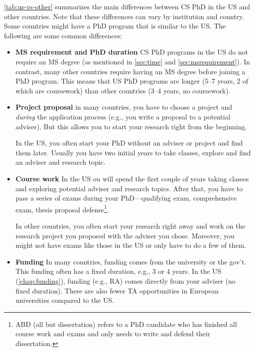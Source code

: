 \documentclass[oneside,11pt]{book}
\begin{document}
\autoref{tab:us-vs-other} summarizes the main differences between CS PhD in the US and other countries. Note that these differences can vary by institution and country.  Some countries might have a PhD program that is similar to the US.  The following are some common differences:
\begin{itemize}

\item \textbf{MS requirement and PhD duration}  CS PhD programs in the US do not require an MS degree (as mentioned in \autoref{sec:time} and \autoref{sec:msrequirement}).  In contrast, many other countries require having an MS degree before joining a PhD program.  This means that US PhD programs are longer (5--7 years, 2 of which are coursework) than other countries (3--4 years, no coursework).

\item \textbf{Project proposal} in many countries, you have to choose a project and  \emph{during} the application process (e.g., you write a proposal to a potential adviser). But this allows you to start your research right from the beginning. 

In the US, you often start your PhD without an adviser or project and find them later. Usually you have two initial years to take classes, explore and find an adviser and research topic. 

\item \textbf{Course work} In the US ou will spend the first couple of years taking classes and exploring potential adviser and research topics. 
After that, you have to pass a series of exams during your PhD---qualifying exam, comprehensive exam, thesis proposal defense\footnote{ABD (all but dissertation) refers to a PhD candidate who has finished all course work and exams and only needs to write and defend their dissertation.}.

In other countries, you often start your research right away and work on the research project you proposed with the adviser you chose. Moreover, you might not have exams like those in the US or only have to do a few of them.

\item \textbf{Funding}  In many countries, funding comes from the university or the gov't. This funding often has a fixed duration, e.g., 3 or 4 years.  In the US (\autoref{chap:funding}), funding (e.g., RA) comes directly from your adviser (no fixed duration).  There are also fewer TA opportunities in European universities compared to the US.


\end{itemize}
\end{document}
